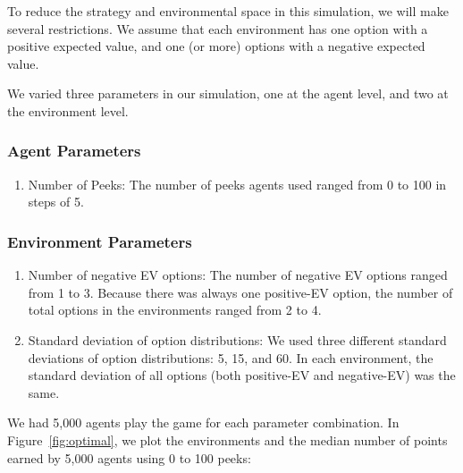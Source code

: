 \documentclass[a4paper,doc,natbib,floatsintext]{apa6}\usepackage[]{graphicx}\usepackage[]{color}
\begin{document}
To reduce the strategy and environmental space in this simulation, we will make several restrictions. We assume that each environment has one option with a positive expected value, and one (or more) options with a negative expected value.

We varied three parameters in our simulation, one at the agent level, and two at the environment level.

\subsubsection{Agent Parameters}

\begin{enumerate}

  \item Number of Peeks: The number of peeks agents used ranged from 0 to 100 in steps of 5.

\end{enumerate}
  
  
\subsubsection{Environment Parameters}

\begin{enumerate}

  \item Number of negative EV options: The number of negative EV options ranged from 1 to 3. Because there was always one positive-EV option, the number of total options in the environments ranged from 2 to 4.
  \item Standard deviation of option distributions: We used three different standard deviations of option distributions: 5, 15, and 60. In each environment, the standard deviation of all options (both positive-EV and negative-EV) was the same.

\end{enumerate}

We had 5,000 agents play the game for each parameter combination. In Figure~\ref{fig:optimal}, we plot the environments and the median number of points earned by 5,000 agents using 0 to 100 peeks:

\end{document}
